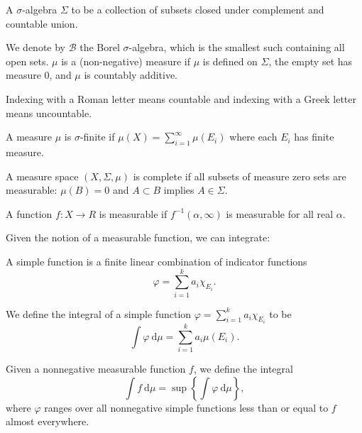\documentclass[10pt, twoside]{article}
\begin{document}
    \begin{defn} A $\sigma$-algebra $\Sigma$ to be a collection
    of subsets closed under complement and countable union.  \end{defn}

     We denote by $\mathcal{B}$ the Borel $\sigma$-algebra, which is the
     smallest such containing all open sets. $\mu$ is a (non-negative) measure
     if $\mu$ is defined on $\Sigma$, the empty set has measure $0$, and $\mu$
     is countably additive. 

    \begin{rmk}[Notation] Indexing with a Roman letter means countable and
    indexing with a Greek letter means uncountable.  \end{rmk}

    \begin{defn} A measure $\mu$ is $\sigma$-finite if $\mu(X) =
    \sum_{i=1}^{\infty} \mu(E_i)$ where each $E_i$ has finite measure.
\end{defn}

    \begin{defn}[Completeness] A measure space $(X,\Sigma, \mu)$ is complete if
    all subsets of measure zero sets are measurable: $\mu(B) = 0$ and $A
\subset B$ implies $A \in \Sigma$.  \end{defn}

    \begin{defn} A function $f: X \rightarrow R$ is
    measurable if $f^{-1}(\alpha, \infty)$ is measurable for all real $\alpha$.
\end{defn}

    Given the notion of a measurable function, we can integrate:

    \begin{defn} A simple function is a finite linear
        combination of indicator functions \[ \varphi = \sum_{i=1}^k
        a_i\chi_{E_i}. \] \end{defn}

    We define the integral of a simple function $\varphi = \sum_{i=1}^k a_i
    \chi_{E_i}$ to be \[\int \varphi\ \mathrm{d}\mu = \sum_{i=1}^k a_i
    \mu(E_i).  \]

    Given a nonnegative measurable function $f$, we define the integral \[\int
    f\ \mathrm{d}\mu = \sup\left\{\int \varphi\ \mathrm{d} \mu\right\},\] where
    $\varphi$ ranges over all nonnegative simple functions less than or equal
    to $f$ almost everywhere.
\end{document}
